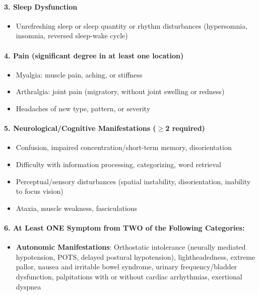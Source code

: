 \begin{requirement}
\paragraph{3. Sleep Dysfunction}
\begin{itemize}
    \item Unrefreshing sleep or sleep quantity or rhythm disturbances (hypersomnia, insomnia, reversed sleep-wake cycle)
\end{itemize}

\paragraph{4. Pain (significant degree in at least one location)}
\begin{itemize}
    \item Myalgia: muscle pain, aching, or stiffness
    \item Arthralgia: joint pain (migratory, without joint swelling or redness)
    \item Headaches of new type, pattern, or severity
\end{itemize}

\paragraph{5. Neurological/Cognitive Manifestations ($\geq$2 required)}
\begin{itemize}
    \item Confusion, impaired concentration/short-term memory, disorientation
    \item Difficulty with information processing, categorizing, word retrieval
    \item Perceptual/sensory disturbances (spatial instability, disorientation, inability to focus vision)
    \item Ataxia, muscle weakness, fasciculations
\end{itemize}

\paragraph{6. At Least ONE Symptom from TWO of the Following Categories:}

\begin{itemize}
    \item \textbf{Autonomic Manifestations}: Orthostatic intolerance (neurally mediated hypotension, POTS, delayed postural hypotension), lightheadedness, extreme pallor, nausea and irritable bowel syndrome, urinary frequency/bladder dysfunction, palpitations with or without cardiac arrhythmias, exertional dyspnea


\end{itemize}
\end{requirement}
